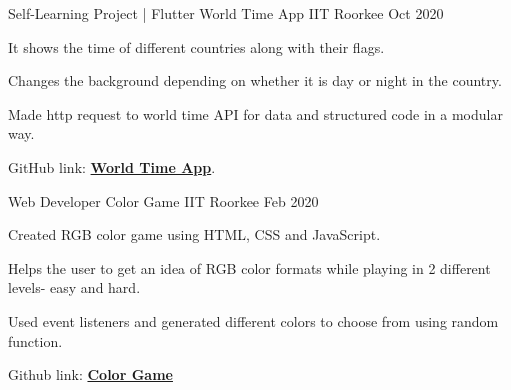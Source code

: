 \begin{cventries}
\cventry
    {Self-Learning Project | Flutter} %
    {World Time App} %
    {IIT Roorkee} %
    {Oct 2020} %
    {
      \begin{cvitems} %
        \item {It shows the time of different countries along with their flags.}
        \item{Changes the background depending on whether it is day or night in the country.}
        \item {Made http request to world time API for data and structured code in a modular way.}
        \item {GitHub link: {\href{https://github.com/anshikamittal25/world_time}{\bf World Time App}}.}
      \end{cvitems}
    }
      

\cventry
    {Web Developer} %
    {Color Game} %
    {IIT Roorkee} %
    {Feb 2020} %
    {
      \begin{cvitems} %
        \item {Created RGB color game using HTML, CSS and JavaScript.}
        \item{Helps the user to get an idea of RGB color formats while playing in 2 different levels- easy and hard.}
        \item {Used event listeners and generated different colors to choose from using random function.}
        \item {Github link: \href{https://github.com/anshikamittal25/color_game}{\bf Color Game}}
      \end{cvitems}
    }

\end{cventries}
